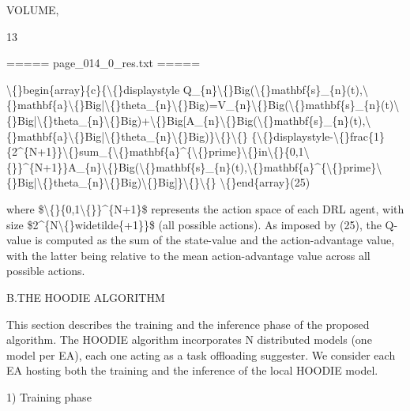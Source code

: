 \documentclass{article}
\begin{document}
VOLUME,

13

===== page\_014\_0\_res.txt =====


\textbackslash\{\}begin\{array\}\{c\}\{\textbackslash\{\}displaystyle Q\_\{n\}\textbackslash\{\}Big(\textbackslash\{\}mathbf\{s\}\_\{n\}(t),\textbackslash\{\}mathbf\{a\}\textbackslash\{\}Big|\textbackslash\{\}theta\_\{n\}\textbackslash\{\}Big)=V\_\{n\}\textbackslash\{\}Big(\textbackslash\{\}mathbf\{s\}\_\{n\}(t)\textbackslash\{\}Big|\textbackslash\{\}theta\_\{n\}\textbackslash\{\}Big)+\textbackslash\{\}Big[A\_\{n\}\textbackslash\{\}Big(\textbackslash\{\}mathbf\{s\}\_\{n\}(t),\textbackslash\{\}mathbf\{a\}\textbackslash\{\}Big|\textbackslash\{\}theta\_\{n\}\textbackslash\{\}Big)\}\textbackslash\{\}\textbackslash\{\} \{\textbackslash\{\}displaystyle-\textbackslash\{\}frac\{1\}\{2\textasciicircum{}\{N+1\}\}\textbackslash\{\}sum\_\{\textbackslash\{\}mathbf\{a\}\textasciicircum{}\{\textbackslash\{\}prime\}\textbackslash\{\}in\textbackslash\{\}\{0,1\textbackslash\{\}\}\textasciicircum{}\{N+1\}\}A\_\{n\}\textbackslash\{\}Big(\textbackslash\{\}mathbf\{s\}\_\{n\}(t),\textbackslash\{\}mathbf\{a\}\textasciicircum{}\{\textbackslash\{\}prime\}\textbackslash\{\}Big|\textbackslash\{\}theta\_\{n\}\textbackslash\{\}Big)\textbackslash\{\}Big]\}\textbackslash\{\}\textbackslash\{\} \textbackslash\{\}end\{array\}(25)

where \$\textbackslash\{\}\{0,1\textbackslash\{\}\}\textasciicircum{}\{N+1\}\$ represents the action space of each DRL agent, with size \$2\textasciicircum{}\{N\textbackslash\{\}widetilde\{+1\}\}\$ (all possible actions). As imposed by (25), the Q-value is computed as the sum of the state-value and the action-advantage value, with the latter being relative to the mean action-advantage value across all possible actions.

B.THE HOODIE ALGORITHM

This section describes the training and the inference phase of the proposed algorithm. The HOODIE algorithm incorporates N distributed models (one model per EA), each one acting as a task offloading suggester. We consider each EA hosting both the training and the inference of the local HOODIE model.

1) Training phase
\end{document}
